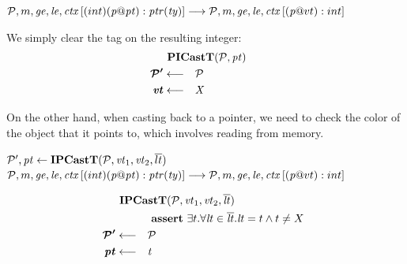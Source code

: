 \documentclass{article}
\begin{document}
         {\(\mathcal{P}, m, \mathit{ge}, \mathit{le}, \mathit{ctx}\left[(int) (\mathit{p} @ \mathit{pt}) : \mathit{ptr(ty)}\right] \longrightarrow
           \mathcal{P}, m, \mathit{ge}, \mathit{le}, \mathit{ctx}\left[(\mathit{p} @ vt) : int\right]\)}

We simply clear the tag on the resulting integer:
\[\begin{aligned}
\truledef{\picastt{\PCT}{\pt}}
\settag{\PCT'}{\PCT}
\settag{\vt}{X}
\end{aligned}\]

On the other hand, when casting back to a pointer, we need to check the color
of the object that it points to, which involves reading from memory.

            {\(\mathcal{P}',\mathit{pt} \leftarrow \mathbf{IPCastT}(\mathcal{P},\mathit{vt}_1,\mathit{vt}_2,\overline{lt})\)}
            {\(\mathcal{P}, m, \mathit{ge}, \mathit{le}, \mathit{ctx}\left[(int) (\mathit{p} @ \mathit{pt}) : \mathit{ptr(ty)}\right] \longrightarrow
              \mathcal{P}, m, \mathit{ge}, \mathit{le}, \mathit{ctx}\left[(\mathit{p} @ vt) : int\right]\)}

\[\begin{aligned}
\truledef{\ipcastt{\PCT}{\vt_1}{\vt_2}{\overline{\lt}}}
\assert{\exists t . \forall \lt \in \overline{\lt} . \lt = t \land t \not = X}
\settag{\PCT'}{\PCT}
\settag{\pt}{t}
\end{aligned}\]
\end{document}
